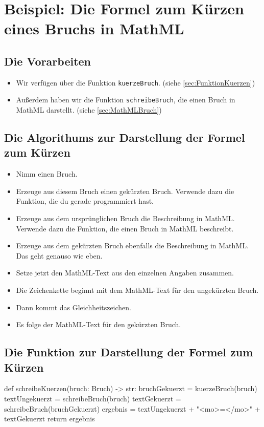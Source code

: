 \section{Beispiel: Die Formel zum Kürzen eines Bruchs in MathML}

\subsection*{Die Vorarbeiten}

\begin{itemize}
	\item Wir verfügen über die Funktion \texttt{kuerzeBruch}. (siehe \ref{sec:FunktionKuerzen})
	\item Außerdem haben wir die Funktion \texttt{schreibeBruch}, die einen Bruch in MathML darstellt. (siehe \ref{sec:MathMLBruch})
\end{itemize}

\subsection*{Die Algorithums zur Darstellung der Formel zum Kürzen}

\begin{itemize}
	\item Nimm einen Bruch.
	\item Erzeuge aus diesem Bruch einen gekürzten Bruch. Verwende dazu die Funktion, die du gerade programmiert hast.
	\item Erzeuge aus dem ursprünglichen Bruch die Beschreibung in MathML. Verwende dazu die Funktion, die einen Bruch in MathML beschreibt.
	\item Erzeuge aus dem gekürzten Bruch ebenfalls die Beschreibung in MathML. Das geht genauso wie eben.
	\item Setze jetzt den MathML-Text aus den einzelnen Angaben zusammen.
	\item Die Zeichenkette beginnt mit dem MathML-Text für den ungekürzten Bruch.
	\item Dann kommt das Gleichheitszeichen.
	\item Es folge der MathML-Text für den gekürzten Bruch.
\end{itemize}

\subsection*{Die Funktion zur Darstellung der Formel zum Kürzen}

\begin{codePython}
def schreibeKuerzen(bruch: Bruch) -> str:
	bruchGekuerzt = kuerzeBruch(bruch)
	textUngekuerzt = schreibeBruch(bruch)
	textGekuerzt = schreibeBruch(bruchGekuerzt)
	ergebnis = textUngekuerzt + "<mo>=</mo>" + textGekuerzt
	return ergebnis
\end{codePython}

